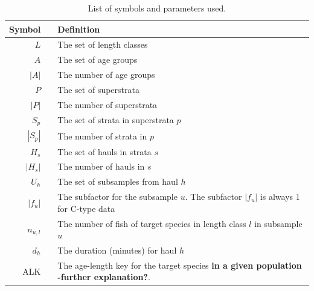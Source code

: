 \documentclass[a4paper 12pt]{article}
\numberwithin{equation}{section}
\begin{document}


\begin{table}[h!]
\centering
\caption{List of symbols and parameters used.}
\label{symbols}
\begin{tabularx}{\linewidth}{r l X}
\toprule 
Symbol   	&  & Definition                  \\[0.7ex]
\midrule
$L$        	&  & The set of length classes    \\[0.7ex]
$A$        	&  & The set of age groups       \\[0.7ex]
$|A|$      	&  & The number of age groups    \\[0.7ex]
$P$        	&  & The set of superstrata      \\[0.7ex]
$|P|$       &  & The number of superstrata   \\[0.7ex]
$S_{p}$     &  & The set of strata in superstrata $p$  \\[0.7ex]
$|S_{p}|$   &  & The number of strata in $p$  \\[0.7ex]
$H_{s}$     &  & The set of hauls in strata $s$  \\[0.7ex]
$|H_{s}|$   &  & The number of hauls in $s$  \\[0.7ex]
$U_{h}$     &  & The set of subsamples from haul $h$  \\[0.7ex]
$|f_{u}|$   &  & The subfactor for the subsample $u$. The subfactor $|f_{u}|$ is always 1 for C-type data  \\[0.7ex]
$n_{u,l}$   &  & The number of fish of target species in length class $l$ in subsample $u$  \\[0.7ex]
$d_{h}$   &  & The duration (minutes) for haul $h$  \\[0.7ex]
ALK  & & The age-length key for the target species {\bf in a given population -further explanation?}.\\
\bottomrule         
\end{tabularx}
\end{table}
\end{document}
